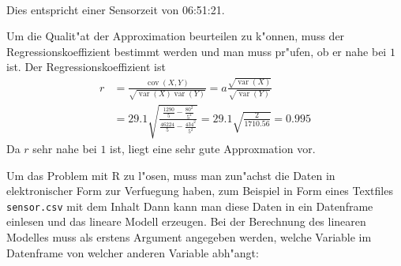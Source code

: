 \begin{loesung}
\begin{teilaufgaben}
\begin{align*}
\end{align*}
Dies entspricht einer Sensorzeit von 06:51:21.
\item
Um die Qualit"at der Approximation beurteilen zu k"onnen, muss
der Regressionskoeffizient bestimmt werden und man muss pr"ufen,
ob er nahe bei $1$ ist. Der Regressionskoeffizient ist
\begin{align*}
r&=\frac{\operatorname{cov}(X,Y)}{\sqrt{\operatorname{var}(X)\operatorname{var}(Y)}}
=a\frac{\sqrt{\operatorname{var}(X)}}{\sqrt{\operatorname{var}(Y)}}
\\
&=
29.1 \sqrt{\frac{\frac{1290}{5}-\frac{80^2}{5^2}}{\frac{46224}{5}-\frac{434^2}{5^2}}}
=29.1 \sqrt{\frac{2}{1710.56}}= 0.995
\end{align*}
Da $r$ sehr nahe bei $1$ ist, liegt eine sehr gute Approxmation vor.
\item
Um das Problem mit R zu l"osen, muss man zun"achst die Daten in
elektronischer Form zur Verfuegung haben, zum Beispiel in Form
eines Textfiles {\tt sensor.csv} mit dem Inhalt
Dann kann man diese Daten in ein Datenframe einlesen und das lineare
Modell erzeugen. Bei der Berechnung des linearen Modelles muss als
erstens Argument angegeben werden, welche Variable im Datenframe von
welcher anderen Variable abh"angt:
\qedhere
\end{teilaufgaben}
\end{loesung}

